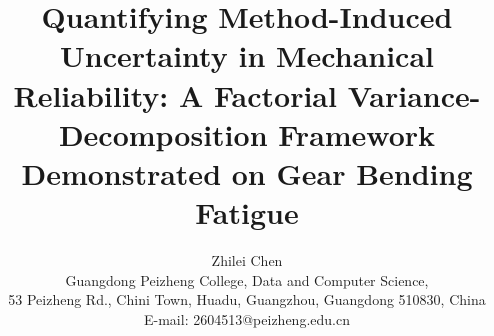 \documentclass[12pt,a4paper]{article}
\begin{document}
\title{\textbf{Quantifying Method-Induced Uncertainty in Mechanical\\
Reliability: A Factorial Variance-Decomposition Framework\\
Demonstrated on Gear Bending Fatigue}}

\author{Zhilei Chen\\
Guangdong Peizheng College, Data and Computer Science,\\
53 Peizheng Rd., Chini Town, Huadu, Guangzhou, Guangdong 510830, China\\
E-mail: 2604513@peizheng.edu.cn}

\maketitle

\end{document}
